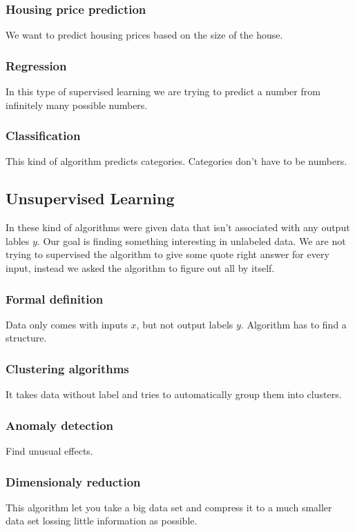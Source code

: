 \documentclass[a4paper]{article}
\begin{document}
\subsubsection{Housing price prediction}
\noindent
We want to predict housing prices based on the size of the house.
\subsubsection{Regression}
\noindent
In this type of supervised learning we are trying to predict a number from infinitely 
many possible numbers.
\subsubsection{Classification}
\noindent
This kind of algorithm predicts categories. Categories don't have to be numbers.
\subsection{Unsupervised Learning}
\noindent
In these kind of algorithms were given data that isn't associated with any output
lables \(y\). Our goal is finding something interesting in unlabeled data. We are not trying to
supervised the algorithm to give some quote right answer for every input, instead we asked the 
algorithm to figure out all by itself. 
\subsubsection{Formal definition}
\noindent
Data only comes with inputs \(x\), but not output labels \(y\). Algorithm has to find a structure.
\subsubsection{Clustering algorithms}
\noindent
It takes data without label and tries to automatically group them into clusters.
\subsubsection{Anomaly detection}
\noindent
Find unusual effects.
\subsubsection{Dimensionaly reduction}
\noindent
This algorithm let you take a big data set and compress it to a much smaller data set lossing 
little information as possible.
\end{document}
